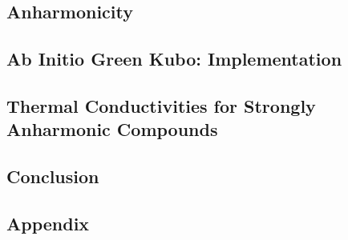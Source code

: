 \documentclass[nobib,a4paper,twoside,notoc,justified,marginals=justified]{tufte-book}
\begin{document}
\chapter{Anharmonicity}


\chapter{Ab Initio Green Kubo: Implementation}


\chapter{Thermal Conductivities for Strongly Anharmonic Compounds}




\chapter*{Conclusion}


\cleardoublepage
{}
{}


\printbibliography

\newcommand{\bibsection}{\section{Bibliography}} %

\begin{appendices}
  \part*{Appendix}
  
\end{appendices}

\end{document}
